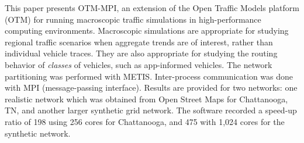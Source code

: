 This paper presents OTM-MPI, an extension of the Open Traffic Models platform (OTM) for running macroscopic traffic simulations in high-performance computing environments. Macroscopic simulations are appropriate for studying regional traffic scenarios when aggregate trends are of interest, rather than individual vehicle traces. They are also appropriate for studying the routing behavior of \textit{classes} of vehicles, such as app-informed vehicles. The network partitioning was performed with METIS. Inter-process communication was done with MPI (message-passing interface). Results are provided for two networks: one realistic network which was obtained from Open Street Maps for Chattanooga, TN, and another larger synthetic grid network. The software recorded a speed-up ratio of 198 using 256 cores for Chattanooga, and 475 with 1,024 cores for the synthetic network. 

